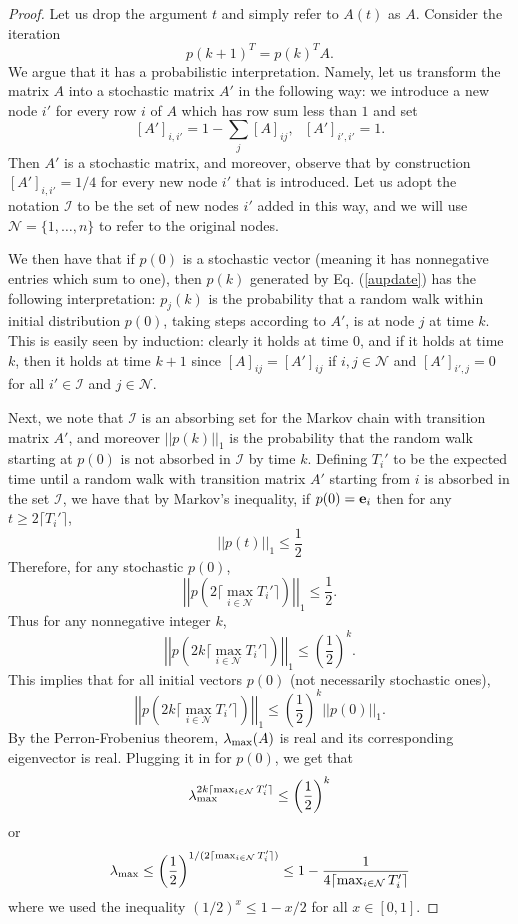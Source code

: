 \documentclass[final]{siamltex}
\begin{document}
\begin{proof} Let us drop the argument $t$ and simply refer to $A(t)$ as $A$. Consider the iteration 
\begin{equation} p(k+1)^T = p(k)^T A. \label{aupdate} \end{equation} We argue that it has a probabilistic interpretation. Namely, let us transform the matrix $A$ into a stochastic matrix $A'$ in the following way: we introduce a new node $i'$ for every row $i$ of $A$ which has row sum less than $1$ and set 
\[ [A']_{i,i'} = 1 - \sum_{j} [A]_{ij}, ~~~ [A']_{i',i'} = 1. \] Then $A'$ is a stochastic matrix, and moreover, observe that by construction $[A']_{i,i'}=1/4$ for every new node $i'$ that is introduced. Let us adopt the notation $\mathcal{I}$ to be the set of new nodes $i'$ added in this way, and we will use $\mathcal{N} = \{1, \ldots, n\}$ to refer to the original nodes.

We then  have that if $p(0)$ is a stochastic vector (meaning it has nonnegative entries which sum to one), then $p(k)$ generated by Eq. (\ref{aupdate}) has the following interpretation: $p_j(k)$ is the probability that a random walk within initial distribution $p(0)$, taking steps according to $A'$, is at node $j$ at time $k$.  This is easily seen by induction:
clearly it holds at time $0$, and if it holds at time $k$, then it holds at time $k+1$ since $[A]_{ij} = [A']_{ij}$ if $i,j \in \mathcal{N}$ and $[A']_{i',j}=0$ for all $i' \in \mathcal{I}$ and $j \in \mathcal{N}$. 

Next, we note  that  $\mathcal{I}$ is an absorbing set for the Markov chain with transition matrix $A'$, and moreover $||p(k)||_1$ is the probability that the
random walk starting at $p(0)$ is not absorbed in $\mathcal{I}$ by time $k$. Defining $T_i'$ to be the expected time until a random walk with transition matrix $A'$ starting from $i$ is absorbed in the set $\mathcal{I}$, we have that by Markov's inequality, if $p(0)={\bf e}_i$ then for any $t \geq 2 \lceil T_i' \rceil$,
\[ \left| \left|p (t) \right| \right|_1  \leq  \frac{1}{2} \] Therefore, for any stochastic $p(0)$, 
\[ \left| \left|p \left( 2 \lceil \max_{i \in \mathcal{N}} T_i' \rceil \right) \right| \right|_1  \leq  \frac{1}{2}. \] Thus for any nonnegative integer $k$, 
\[ \left| \left|p \left( 2 k \lceil \max_{i \in \mathcal{N}} T_i' \rceil \right) \right| \right|_1 \leq \left( \frac{1}{2} \right)^k. \] This implies that for all initial vectors $p(0)$ (not necessarily stochastic ones), 
\[ \left| \left| p \left( 2 k \lceil \max_{i \in \mathcal{N}} T_i' \rceil \right) \right| \right|_1 \leq \left( \frac{1}{2} \right)^k ||p(0)||_1 .\] By the Perron-Frobenius theorem, $\lambda_{\rm max}(A)$ is real and its corresponding eigenvector is real. Plugging it in for $p(0)$, we get that 
\[ \lambda_{\rm max}^{2k \lceil \max_{i \in \mathcal{N}} T_i' \rceil} \leq \left( \frac{1}{2} \right)^k \] 
or \begin{equation} \label{lambdap}  \lambda_{\rm max} \leq \left( \frac{1}{2} \right)^{1/( 2 \lceil \max_{i \in \mathcal{N}} T_i' \rceil)} \leq 1 - \frac{1}{4 \lceil \max_{i \in \mathcal{N}} T_i' \rceil} \end{equation} where we used the inequality $(1/2)^x \leq 1 - x/2$ for all $x \in [0,1]$. 


\end{proof}
\end{document}

